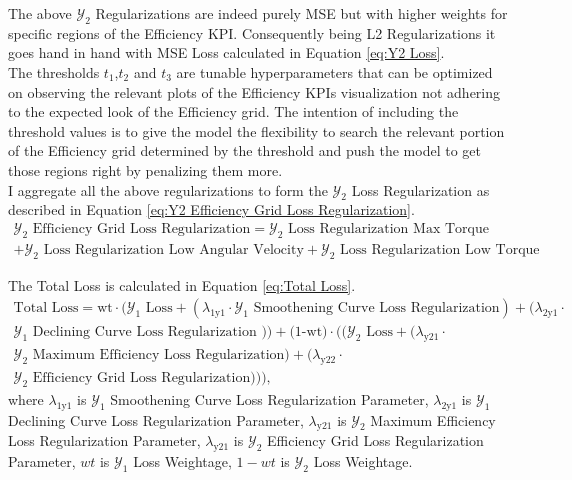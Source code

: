 \documentclass{report} %
\begin{document}
\begin{enumerate}
\begin{enumerate}
\end{enumerate}

The above $\mathcal{Y}_2$ Regularizations are indeed purely \ac{MSE} but with higher weights for specific regions of the Efficiency \ac{KPI}.
Consequently being L2 Regularizations it goes hand in hand with \ac{MSE} Loss calculated in Equation \ref{eq:Y2 Loss}.\\
The thresholds \(t_{1}\),\(t_{2}\) and \(t_{3}\) are tunable hyperparameters that can be optimized on observing the relevant plots of the Efficiency \ac{KPI}s visualization 
not adhering to the expected look of the Efficiency grid. The intention of including the threshold values is to give the model the flexibility to search the relevant portion of the Efficiency grid determined by the threshold 
and push the model to get those regions right by penalizing them more.\\

I aggregate all the above regularizations to form the $\mathcal{Y}_2$ Loss Regularization as described in Equation \ref{eq:Y2 Efficiency Grid Loss Regularization}.
\begin{equation}
    \begin{split}
    \text{$\mathcal{Y}_2$ Efficiency Grid Loss Regularization} = \text{$\mathcal{Y}_2$ Loss Regularization Max Torque} \\
    + \text{$\mathcal{Y}_2$ Loss Regularization Low Angular Velocity} + \text{$\mathcal{Y}_2$ Loss Regularization Low Torque}
    \end{split}
    \label{eq:Y2 Efficiency Grid Loss Regularization}
\end{equation}

\end{enumerate}

The Total Loss is calculated in Equation \ref{eq:Total Loss}.
\begin{equation}
    \begin{split}
\text{Total Loss} = \text{wt} \cdot (\text{$\mathcal{Y}_1$ Loss} + (\lambda_{\text{1y1}} \cdot \text{$\mathcal{Y}_1$ Smoothening Curve Loss Regularization}) +  (\lambda_{\text{2y1}} \cdot \\
\text{$\mathcal{Y}_1$ Declining Curve Loss Regularization })) + \text{(1-wt)} \cdot ((\text{$\mathcal{Y}_2$ Loss} + (\lambda_{\text{y21}} \cdot \\ 
\text{$\mathcal{Y}_2$ Maximum Efficiency Loss Regularization}) + (\lambda_{\text{y22}} \cdot \\
\text{$\mathcal{Y}_2$ Efficiency Grid Loss Regularization}))),
    \end{split}
    \label{eq:Total Loss}
\end{equation}
where \(\lambda_{\text{1y1}}\) is $\mathcal{Y}_1$ Smoothening Curve Loss Regularization Parameter, \(\lambda_{\text{2y1}}\) is $\mathcal{Y}_1$ Declining Curve Loss Regularization Parameter,
        \(\lambda_{\text{y21}}\) is $\mathcal{Y}_2$ Maximum Efficiency Loss Regularization Parameter, \(\lambda_{\text{y21}}\) is $\mathcal{Y}_2$ Efficiency Grid Loss Regularization Parameter, 
        \(wt\) is $\mathcal{Y}_1$ Loss Weightage, \(1-wt\) is $\mathcal{Y}_2$ Loss Weightage. \\
\end{document}
